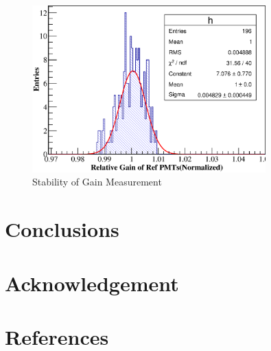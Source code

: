 \documentclass[5p, times]{elsarticle}
\begin{document}
\begin{figure}[h!]
 \centering
 \includegraphics[width=90mm]{RelativeGainRefDist}
\caption{Stability of Gain Measurement}
\label{fig:gain_stability}
\end{figure} 

\section{Conclusions}
\label{sec:conclustions}

\section*{Acknowledgement}

\appendix
\section{}
\label{app:}

\section*{References}

\end{document}
